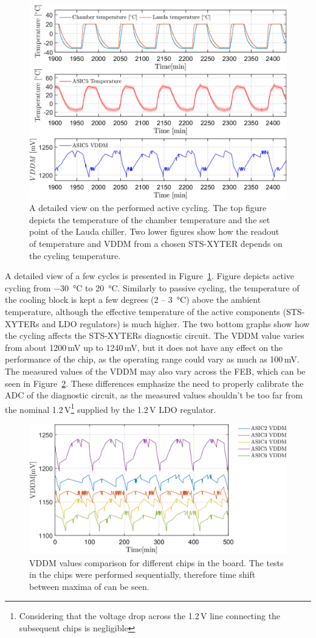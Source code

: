 \begin{figure}[!h]
\centering
\includegraphics[width=0.65\columnwidth]{Chapter4/images/FEB0ASIC5COMP.png}
\caption{A detailed view on the performed active cycling. The top figure depicts the temperature of the chamber temperature and the set point of the Lauda chiller. Two lower figures show how the readout of temperature and VDDM from a chosen STS-XYTER depends on the cycling temperature. }
\label{fig_active_detailed}
\end{figure}
A detailed view of a few cycles is presented in Figure~\ref{fig_active_detailed}. Figure depicts active cycling from \SI{-30}{\celsius} to \SI{20}{\celsius}. Similarly to passive cycling, the temperature of the cooling block is kept a few degrees (2 -- \SI{3}{\celsius}) above the ambient temperature, although the effective temperature of the active components (STS-XYTERs and \gls{LDO} regulators) is much higher. The two bottom graphs show how the cycling affects the STS-XYTERs diagnostic circuit. The VDDM value varies from about 1200\,mV up to 1240\,mV, but it does not have any effect on the performance of the chip, as the operating range could vary as much as 100\,mV. The measured values of the VDDM may also vary across the \gls{FEB}, which can be seen in Figure~\ref{feb_vary}. These differences emphasize the need to properly calibrate the ADC of the diagnostic circuit, as the measured values shouldn't be too far from the nominal 1.2\,V\footnote{Considering that the voltage drop across the 1.2\,V line connecting the subsequent chips is negligible} supplied by the 1.2\,V \gls{LDO} regulator. 
\begin{figure}[!h]
\centering
\includegraphics[width=0.75\columnwidth]{Chapter4/images/vddm_comp.png}
\caption{VDDM values comparison for different chips in the board. The tests in the chips were performed sequentially, therefore time shift between maxima of  can be seen.}
\label{feb_vary}
\end{figure}


